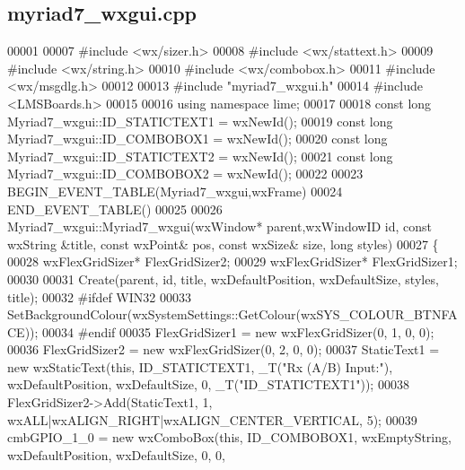 \subsection{myriad7\+\_\+wxgui.\+cpp}
\label{myriad7__wxgui_8cpp_source}

\begin{DoxyCode}
00001 
00007 \textcolor{preprocessor}{#include <wx/sizer.h>}
00008 \textcolor{preprocessor}{#include <wx/stattext.h>}
00009 \textcolor{preprocessor}{#include <wx/string.h>}
00010 \textcolor{preprocessor}{#include <wx/combobox.h>}
00011 \textcolor{preprocessor}{#include <wx/msgdlg.h>}
00012 
00013 \textcolor{preprocessor}{#include "myriad7_wxgui.h"}
00014 \textcolor{preprocessor}{#include <LMSBoards.h>}
00015 
00016 \textcolor{keyword}{using namespace }lime;
00017 
00018 \textcolor{keyword}{const} \textcolor{keywordtype}{long} Myriad7_wxgui::ID_STATICTEXT1 = wxNewId();
00019 \textcolor{keyword}{const} \textcolor{keywordtype}{long} Myriad7_wxgui::ID_COMBOBOX1 = wxNewId();
00020 \textcolor{keyword}{const} \textcolor{keywordtype}{long} Myriad7_wxgui::ID_STATICTEXT2 = wxNewId();
00021 \textcolor{keyword}{const} \textcolor{keywordtype}{long} Myriad7_wxgui::ID_COMBOBOX2 = wxNewId();
00022 
00023 BEGIN\_EVENT\_TABLE(Myriad7_wxgui,wxFrame)
00024 END\_EVENT\_TABLE()
00025 
00026 Myriad7_wxgui::Myriad7_wxgui(wxWindow* parent,wxWindowID \textcolor{keywordtype}{id}, const wxString &title, const wxPoint& pos,
      const wxSize& size, \textcolor{keywordtype}{long} styles)
00027 \{
00028     wxFlexGridSizer* FlexGridSizer2;
00029     wxFlexGridSizer* FlexGridSizer1;
00030 
00031     Create(parent, \textcolor{keywordtype}{id}, title, wxDefaultPosition, wxDefaultSize, styles, title);
00032 \textcolor{preprocessor}{#ifdef WIN32}
00033     SetBackgroundColour(wxSystemSettings::GetColour(wxSYS\_COLOUR\_BTNFACE));
00034 \textcolor{preprocessor}{#endif}
00035     FlexGridSizer1 = \textcolor{keyword}{new} wxFlexGridSizer(0, 1, 0, 0);
00036     FlexGridSizer2 = \textcolor{keyword}{new} wxFlexGridSizer(0, 2, 0, 0);
00037     StaticText1 = \textcolor{keyword}{new} wxStaticText(\textcolor{keyword}{this}, ID\_STATICTEXT1, \_T(\textcolor{stringliteral}{"Rx (A/B) Input:"}), wxDefaultPosition, 
      wxDefaultSize, 0, \_T(\textcolor{stringliteral}{"ID\_STATICTEXT1"}));
00038     FlexGridSizer2->Add(StaticText1, 1, wxALL|wxALIGN\_RIGHT|wxALIGN\_CENTER\_VERTICAL, 5);
00039     cmbGPIO\_1\_0 = \textcolor{keyword}{new} wxComboBox(\textcolor{keyword}{this}, ID\_COMBOBOX1, wxEmptyString, wxDefaultPosition, wxDefaultSize, 0, 0,

\end{DoxyCode}
